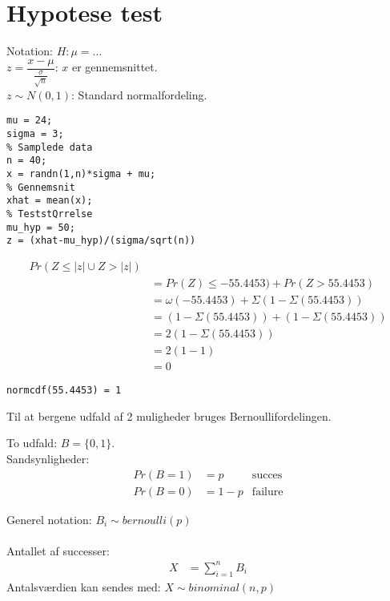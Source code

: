 \documentclass[Main]{subfiles}
\begin{document}
\chapter{Hypotese test}

\begin{theo}[Hypotesetest]
Notation: $H: \mu = \ldots $ \\
$ z = \dfrac{x - \mu}{ \frac{\sigma}{\sqrt{n}}}  $: $x$ er gennemsnittet.\\
$ z \sim N(0,1)$: Standard normalfordeling.

\begin{lstlisting}[style=Code-Matlab]
%Sand middelverdi og std. afvigelse
mu = 24;
sigma = 3;
% Samplede data
n = 40;
x = randn(1,n)*sigma + mu;
% Gennemsnit
xhat = mean(x);
% TeststQrrelse
mu_hyp = 50;
z = (xhat-mu_hyp)/(sigma/sqrt(n))
\end{lstlisting}


\begin{align*}
Pr ( Z \leq |z| \cup Z > |z|) & \\
	&= Pr(Z) \leq -55.4453) + Pr(Z > 55.4453) \\
	&= \omega(-55.4453) + \Sigma(1 - \Sigma(55.4453)) \\
	&= (1 - \Sigma(55.4453)) + (1 - \Sigma(55.4453)) \\
	&= 2(1 - \Sigma(55.4453)) \\
	&= 2(1-1) \\
	&= 0
\end{align*}

\begin{lstlisting}[style=Code-Matlab]
normcdf(55.4453) = 1
\end{lstlisting}
\end{theo}

Til at bergene udfald af 2 muligheder bruges Bernoullifordelingen.
\begin{theo}[Bernoullifordelingen]
To udfald: $B = \{0,1\}$.
\\
Sandsynligheder:
\begin{align*}
Pr(B=1) &= p & \text{succes} \\
Pr(B=0) &= 1-p & \text{failure}
\end{align*}

Generel notation: $B_i\sim bernoulli(p)$
\\
\\
Antallet af successer: 
\begin{align*}
X &= \sum_{i=1}^n B_i
\end{align*}
Antalsværdien kan sendes med: $X \sim binominal(n,p)$

\end{theo}
\end{document}
